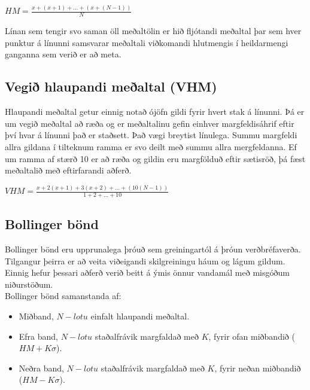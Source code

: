 \documentclass{article}
\begin{document}
\begin{center}
  $HM = \frac{x+(x+1)+\dots+(x+(N-1))}{N}$ 
\end{center}


Línan sem tengir svo saman öll meðaltölin er hið
fljótandi meðaltal þar sem hver punktur á línunni
samsvarar 
meðaltali viðkomandi hlutmengis í heildarmengi ganganna
sem verið er að meta. 
 
\subsection{Vegið hlaupandi meðaltal (VHM)}
\label{sec:weighted_running_average}
Hlaupandi meðaltal getur einnig notað ójöfn gildi fyrir
hvert stak á línunni.
Þá er um vegið meðaltal að ræða og er meðaltalinu gefin
einhver margfeldisáhrif eftir því hvar á línunni það er
staðsett. 
Það vægi breytist línulega. Summu margfeldi allra
gildana í tilteknum ramma er svo deilt með summu allra
mergfeldanna. 
Ef um ramma af stærð 10 er að ræða og gildin eru
margfölduð eftir sætisröð, þá fæst meðaltalið með eftirfarandi aðferð. 
\begin{center}
  $VHM = \frac{x+2(x+1)+3(x+2)+\dots+(10(N-1))}{1+2+\dots+10}$ 
\end{center}


\subsection{Bollinger bönd}
\label{sec:bollinger_bands}


Bollinger bönd eru upprunalega þróuð sem greiningartól
á þróun verðbréfaverða. 
Tilgangur þeirra er að veita viðeigandi skilgreiningu háum og lágum gildum. Einnig hefur þessari 
aðferð verið beitt á ýmis önnur vandamál með misgóðum niðurstöðum. \\

Bollinger bönd samanstanda af:
\begin{itemize}
  \item Miðband, $N-lotu$ einfalt hlaupandi meðaltal.
  \item Efra band, $N-lotu$ staðalfrávik margfaldað með $K$, fyrir ofan miðbandið ($HM + K\sigma$).
  \item Neðra band, $N-lotu$ staðalfrávik margfaldað með $K$, fyrir neðan miðbandið ($HM -K\sigma$).
\end{itemize}
\end{document}
